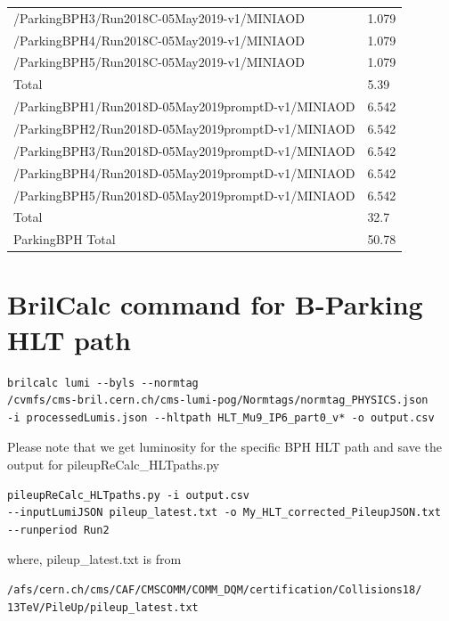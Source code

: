 \begin{table}[htb!]
\begin{center}
\begin{tabular}{l|l}
      /ParkingBPH3/Run2018C-05May2019-v1/MINIAOD  & 1.079 \\
      /ParkingBPH4/Run2018C-05May2019-v1/MINIAOD  & 1.079 \\
      /ParkingBPH5/Run2018C-05May2019-v1/MINIAOD  & 1.079 \\
      Total & 5.39\\
      \hline
      /ParkingBPH1/Run2018D-05May2019promptD-v1/MINIAOD  & 6.542 \\
      /ParkingBPH2/Run2018D-05May2019promptD-v1/MINIAOD  & 6.542 \\
      /ParkingBPH3/Run2018D-05May2019promptD-v1/MINIAOD  & 6.542 \\
      /ParkingBPH4/Run2018D-05May2019promptD-v1/MINIAOD  & 6.542 \\
      /ParkingBPH5/Run2018D-05May2019promptD-v1/MINIAOD  & 6.542 \\
      Total & 32.7\\
      \hline
      ParkingBPH Total & 50.78 \\
      \hline
    \end{tabular}
    \label{tab:datasample2018BPH}
  \end{center}
\end{table}


\section{BrilCalc command for B-Parking HLT path}\label{sec:PU}

\begin{verbatim}
brilcalc lumi --byls --normtag 
/cvmfs/cms-bril.cern.ch/cms-lumi-pog/Normtags/normtag_PHYSICS.json 
-i processedLumis.json --hltpath HLT_Mu9_IP6_part0_v* -o output.csv
\end{verbatim}
Please note that we get luminosity for the specific BPH HLT path and save the output for pileupReCalc\_HLTpaths.py

\begin{verbatim}
pileupReCalc_HLTpaths.py -i output.csv 
--inputLumiJSON pileup_latest.txt -o My_HLT_corrected_PileupJSON.txt 
--runperiod Run2
\end{verbatim}

where, pileup\_latest.txt is from

\begin{verbatim}
/afs/cern.ch/cms/CAF/CMSCOMM/COMM_DQM/certification/Collisions18/
13TeV/PileUp/pileup_latest.txt
\end{verbatim}


